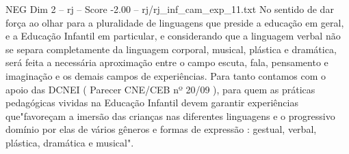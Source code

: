 \begin{textsample}{NEG Dim 2 – rj – Score -2.00 – rj/rj\_inf\_cam\_exp\_11.txt}
No sentido de dar força ao olhar para a pluralidade de linguagens que preside a educação em geral, e a Educação Infantil em particular, e considerando que a linguagem verbal não se separa completamente da linguagem corporal, musical, plástica e dramática, será feita a necessária aproximação entre o campo escuta, fala, pensamento e imaginação e os demais campos de experiências.
Para tanto contamos com o apoio das DCNEI ( Parecer CNE/CEB nº 20/09 ), para quem as práticas pedagógicas vividas na Educação Infantil devem garantir experiências que"favoreçam a imersão das crianças nas diferentes linguagens e o progressivo domínio por elas de vários gêneros e formas de expressão : gestual, verbal, plástica, dramática e musical".

\end{textsample}
